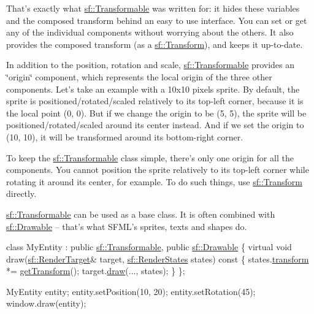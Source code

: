 That's exactly what \hyperlink{classsf_1_1Transformable}{sf\-::\-Transformable} was written for\-: it hides these variables and the composed transform behind an easy to use interface. You can set or get any of the individual components without worrying about the others. It also provides the composed transform (as a \hyperlink{classsf_1_1Transform}{sf\-::\-Transform}), and keeps it up-\/to-\/date.

In addition to the position, rotation and scale, \hyperlink{classsf_1_1Transformable}{sf\-::\-Transformable} provides an \char`\"{}origin\char`\"{} component, which represents the local origin of the three other components. Let's take an example with a 10x10 pixels sprite. By default, the sprite is positioned/rotated/scaled relatively to its top-\/left corner, because it is the local point (0, 0). But if we change the origin to be (5, 5), the sprite will be positioned/rotated/scaled around its center instead. And if we set the origin to (10, 10), it will be transformed around its bottom-\/right corner.

To keep the \hyperlink{classsf_1_1Transformable}{sf\-::\-Transformable} class simple, there's only one origin for all the components. You cannot position the sprite relatively to its top-\/left corner while rotating it around its center, for example. To do such things, use \hyperlink{classsf_1_1Transform}{sf\-::\-Transform} directly.

\hyperlink{classsf_1_1Transformable}{sf\-::\-Transformable} can be used as a base class. It is often combined with \hyperlink{classsf_1_1Drawable}{sf\-::\-Drawable} -- that's what S\-F\-M\-L's sprites, texts and shapes do. 
\begin{DoxyCode}
\textcolor{keyword}{class }MyEntity : \textcolor{keyword}{public} \hyperlink{classsf_1_1Transformable}{sf::Transformable}, \textcolor{keyword}{public} \hyperlink{classsf_1_1Drawable}{sf::Drawable}
\{
    \textcolor{keyword}{virtual} \textcolor{keywordtype}{void} draw(\hyperlink{classsf_1_1RenderTarget}{sf::RenderTarget}& target, \hyperlink{classsf_1_1RenderStates}{sf::RenderStates} states)\textcolor{keyword}{
       const}
\textcolor{keyword}{    }\{
        states.\hyperlink{classsf_1_1RenderStates_a1f737981a0f2f0d4bb8dac866a8d1149}{transform} *= \hyperlink{classsf_1_1Transformable_a3b48c3362e3e2c14fef7551252deb7bb}{getTransform}();
        target.\hyperlink{classsf_1_1RenderTarget_a12417a3bcc245c41d957b29583556f39}{draw}(..., states);
    \}
\};

MyEntity entity;
entity.setPosition(10, 20);
entity.setRotation(45);
window.draw(entity);
\end{DoxyCode}


